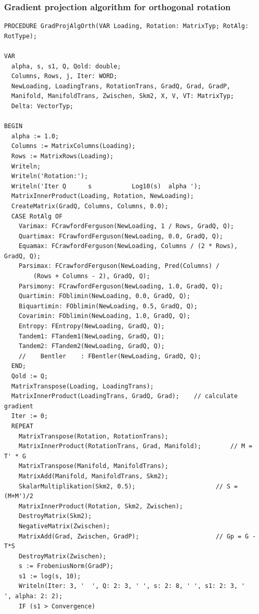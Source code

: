 \subsubsection{Gradient projection algorithm for orthogonal rotation}


\begin{lstlisting}[caption=Implementation of the gradient projection algorithm for orthogonal rotation]
PROCEDURE GradProjAlgOrth(VAR Loading, Rotation: MatrixTyp; RotAlg: RotType);

VAR
  alpha, s, s1, Q, Qold: double;
  Columns, Rows, j, Iter: WORD;
  NewLoading, LoadingTrans, RotationTrans, GradQ, Grad, GradP,
  Manifold, ManifoldTrans, Zwischen, Skm2, X, V, VT: MatrixTyp;
  Delta: VectorTyp;

BEGIN
  alpha := 1.0;
  Columns := MatrixColumns(Loading);
  Rows := MatrixRows(Loading);
  Writeln;
  Writeln('Rotation:');
  Writeln('Iter Q      s           Log10(s)  alpha ');
  MatrixInnerProduct(Loading, Rotation, NewLoading);
  CreateMatrix(GradQ, Columns, Columns, 0.0);
  CASE RotAlg OF
    Varimax: FCrawfordFerguson(NewLoading, 1 / Rows, GradQ, Q);
    Quartimax: FCrawfordFerguson(NewLoading, 0.0, GradQ, Q);
    Equamax: FCrawfordFerguson(NewLoading, Columns / (2 * Rows), GradQ, Q);
    Parsimax: FCrawfordFerguson(NewLoading, Pred(Columns) /
        (Rows + Columns - 2), GradQ, Q);
    Parsimony: FCrawfordFerguson(NewLoading, 1.0, GradQ, Q);
    Quartimin: FOblimin(NewLoading, 0.0, GradQ, Q);
    Biquartimin: FOblimin(NewLoading, 0.5, GradQ, Q);
    Covarimin: FOblimin(NewLoading, 1.0, GradQ, Q);
    Entropy: FEntropy(NewLoading, GradQ, Q);
    Tandem1: FTandem1(NewLoading, GradQ, Q);
    Tandem2: FTandem2(NewLoading, GradQ, Q);
    //    Bentler    : FBentler(NewLoading, GradQ, Q);
  END;
  Qold := Q;
  MatrixTranspose(Loading, LoadingTrans);
  MatrixInnerProduct(LoadingTrans, GradQ, Grad);    // calculate gradient
  Iter := 0;
  REPEAT
    MatrixTranspose(Rotation, RotationTrans);
    MatrixInnerProduct(RotationTrans, Grad, Manifold);        // M = T' * G
    MatrixTranspose(Manifold, ManifoldTrans);
    MatrixAdd(Manifold, ManifoldTrans, Skm2);
    SkalarMultiplikation(Skm2, 0.5);                      // S = (M+M')/2
    MatrixInnerProduct(Rotation, Skm2, Zwischen);
    DestroyMatrix(Skm2);
    NegativeMatrix(Zwischen);
    MatrixAdd(Grad, Zwischen, GradP);                     // Gp = G - T*S
    DestroyMatrix(Zwischen);
    s := FrobeniusNorm(GradP);
    s1 := log(s, 10);
    Writeln(Iter: 3, '  ', Q: 2: 3, ' ', s: 2: 8, ' ', s1: 2: 3, '     ', alpha: 2: 2);
    IF (s1 > Convergence)

\end{lstlisting}
